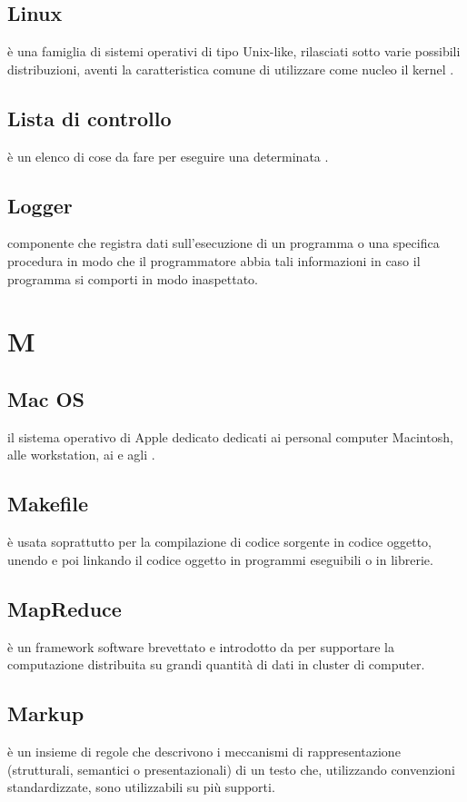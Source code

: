 \documentclass[12pt,a4paper]{article}
\begin{document}
\subsection{Linux} 
 è una famiglia di sistemi operativi  di tipo Unix-like, rilasciati sotto varie possibili distribuzioni, aventi la caratteristica comune di utilizzare come nucleo il kernel .

\subsection{Lista di controllo} 
 è un elenco di cose da fare per eseguire una determinata .

\subsection{Logger} 
componente che registra dati sull'esecuzione di un programma o una specifica procedura in modo che il programmatore abbia tali informazioni in caso il programma si comporti in modo inaspettato.


\newpage

\section{M}


\subsection{Mac OS} 
 il sistema operativo di Apple dedicato dedicati ai personal computer Macintosh, alle workstation, ai  e agli .

\subsection{Makefile} 
 è usata soprattutto per la compilazione di codice sorgente in codice oggetto, unendo e poi linkando il codice oggetto in programmi eseguibili o in librerie.

\subsection{MapReduce} 
 è un framework software brevettato e introdotto da  per supportare la computazione distribuita su grandi quantità di dati in cluster di computer.

\subsection{Markup} 
 è un insieme di regole che descrivono i meccanismi di rappresentazione (strutturali, semantici o presentazionali) di un testo che, utilizzando convenzioni standardizzate, sono utilizzabili su più supporti.
\end{document}
